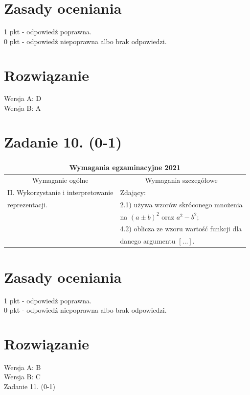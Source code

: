 \documentclass[10pt]{article}
\begin{document}
\section*{Zasady oceniania}
1 pkt - odpowiedź poprawna.\\
0 pkt - odpowiedź niepoprawna albo brak odpowiedzi.

\section*{Rozwiązanie}
Wersja A: D\\
Wersja B: A

\section*{Zadanie 10. (0-1)}
\begin{center}
\begin{tabular}{|l|l|}
\hline
\multicolumn{2}{|c|}{Wymagania egzaminacyjne 2021} \\
\hline
\multicolumn{1}{|c|}{Wymaganie ogólne} & \multicolumn{1}{c|}{Wymagania szczegółowe} \\
\hline
II. Wykorzystanie i interpretowanie & Zdający: \\
reprezentacji. & 2.1) używa wzorów skróconego mnożenia \\
 & na $(a \pm b)^{2}$ oraz $a^{2}-b^{2} ;$ \\
 & 4.2) oblicza ze wzoru wartość funkcji dla \\
 & danego argumentu $[\ldots]$. \\
\hline
\end{tabular}
\end{center}

\section*{Zasady oceniania}
1 pkt - odpowiedź poprawna.\\
0 pkt - odpowiedź niepoprawna albo brak odpowiedzi.

\section*{Rozwiązanie}
Wersja A: B\\
Wersja B: C\\
Zadanie 11. (0-1)
\end{document}
